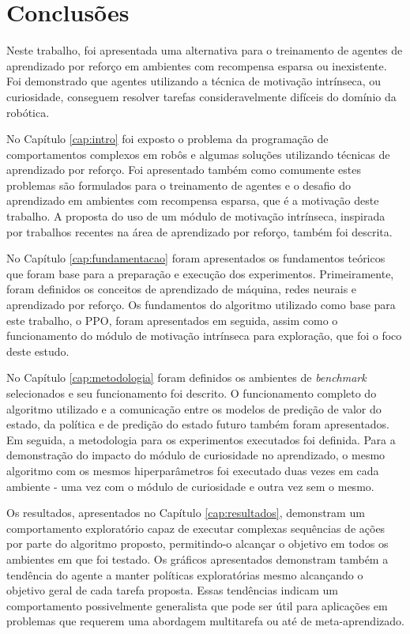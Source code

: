 \chapter{Conclusões}
\label{cap:conclusao}

Neste trabalho, foi apresentada uma alternativa para o treinamento de agentes de aprendizado por reforço em ambientes com recompensa esparsa ou inexistente. Foi demonstrado que agentes utilizando a técnica de motivação intrínseca, ou curiosidade, conseguem resolver tarefas consideravelmente difíceis do domínio da robótica.

No Capítulo \ref{cap:intro} foi exposto o problema da programação de comportamentos complexos em robôs e algumas soluções utilizando técnicas de aprendizado por reforço. Foi apresentado também como comumente estes problemas são formulados para o treinamento de agentes e o desafio do aprendizado em ambientes com recompensa esparsa, que é a motivação deste trabalho. A proposta do uso de um módulo de motivação intrínseca, inspirada por trabalhos recentes na área de aprendizado por reforço, também foi descrita.

No Capítulo \ref{cap:fundamentacao} foram apresentados os fundamentos teóricos que foram base para a preparação e execução dos experimentos. Primeiramente, foram definidos os conceitos de aprendizado de máquina, redes neurais e aprendizado por reforço. Os fundamentos do algoritmo utilizado como base para este trabalho, o PPO, foram apresentados em seguida, assim como o funcionamento do módulo de motivação intrínseca para exploração, que foi o foco deste estudo.

No Capítulo \ref{cap:metodologia} foram definidos os ambientes de \textit{benchmark} selecionados e seu funcionamento foi descrito. O funcionamento completo do algoritmo utilizado e a comunicação entre os modelos de predição de valor do estado, da política e de predição do estado futuro também foram apresentados. Em seguida, a metodologia para os experimentos executados foi definida. Para a demonstração do impacto do módulo de curiosidade no aprendizado, o mesmo algoritmo com os mesmos hiperparâmetros foi executado duas vezes em cada ambiente - uma vez com o módulo de curiosidade e outra vez sem o mesmo.

Os resultados, apresentados no Capítulo \ref{cap:resultados}, demonstram um comportamento exploratório capaz de executar complexas sequências de ações por parte do algoritmo proposto, permitindo-o alcançar o objetivo em todos os ambientes em que foi testado. Os gráficos apresentados demonstram também a tendência do agente a manter políticas exploratórias mesmo alcançando o objetivo geral de cada tarefa proposta. Essas tendências indicam um comportamento possivelmente generalista que pode ser útil para aplicações em problemas que requerem uma abordagem multitarefa ou até de meta-aprendizado.

